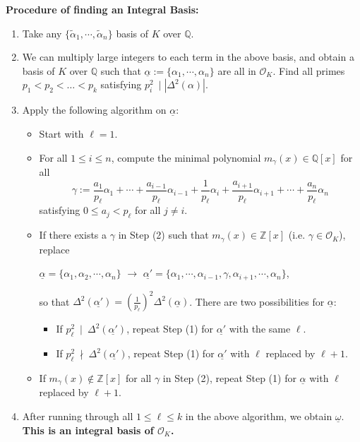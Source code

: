\noindent \textbf{Procedure of finding an Integral Basis:}
\begin{enumerate}
    \item[(a)] Take any  $\{\tilde{\alpha}_1,\cdots,\tilde{\alpha}_n\}$ basis of $K$ over $\mathbb{Q}$.
    \item[(b)] We can multiply large integers to each term in the above basis, and obtain a basis of $K$ over $\mathbb{Q}$ such that $\underline{\alpha}:=\{ \alpha_1,\cdots,\alpha_n\}$ are all in $\mathcal{O}_K$.
    Find all primes $p_1 < p_2 < \dots < p_k$ satisfying $p_i^2\ \mid |\Delta^2(\alpha)|$.
    
    \item[(c)] Apply the following algorithm on $\underline{\alpha}$:
    \begin{itemize}
        \item[(1)]  Start with $\ell = 1$.
        \item[(2)] For all $1 \leq i \leq n$, compute the minimal polynomial $m_{\gamma}(x) \in \mathbb{Q}[x]$ for all  $$\gamma:=\frac{a_1}{p_{\ell}}\alpha_1+\cdots+\frac{a_{i-1}}{p_{\ell}}\alpha_{i-1}+\frac{1}{p_{\ell}}\alpha_i+\frac{a_{i+1}}{p_{\ell}}\alpha_{i+1}+\cdots+\frac{a_n}{p_{\ell}}\alpha_n$$
    satisfying $0 \leq a_j < p_{\ell}$ for all $j \neq i$.
        \item[(3)] If there exists a $\gamma$ in Step (2) such that $m_{\gamma}(x)\in \mathbb{Z}[x]$ (i.e. $\gamma \in \mathcal{O}_K$), replace 
    \begin{center}
    $\underline{\alpha}=\{\alpha_1,\alpha_2,\cdots,\alpha_n\}$ \quad $\longrightarrow$ \quad $\underline{\alpha'}=\{\alpha_1,\cdots,\alpha_{i-1},\gamma,\alpha_{i+1},\cdots, \alpha_n\}$,    
    \end{center}
     so that $\Delta^2(\underline{\alpha'})=(\frac{1}{p_{\ell}})^2\Delta^2(\underline{\alpha})$. There are two possibilities for $\underline{\alpha}$:
     \begin{itemize}
         \item[(i)] If $p_{\ell}^2\ \mid\ \Delta^2(\underline{\alpha'})$, repeat Step (1) for $\underline{\alpha'}$ with the same $\ell$.
         \item[(ii)] If $p_{\ell}^2\ \nmid\ \Delta^2(\underline{\alpha'})$, repeat Step (1) for $\underline{\alpha'}$ with $\ell$ replaced by $\ell+1$. 
     \end{itemize}
     \item[(4)] If $m_{\gamma}(x)\notin \mathbb{Z}[x]$ for all $\gamma$ in Step (2), repeat Step (1) for $\underline{\alpha}$ with $\ell$ replaced by $\ell+1$.
    \end{itemize}
    
    \item[(d)] After running through all $1 \leq \ell \leq k$ in the above algorithm, we obtain $\underline{\omega}$. {\bf This is an integral basis of $\mathcal{O}_K$.}
\end{enumerate}

